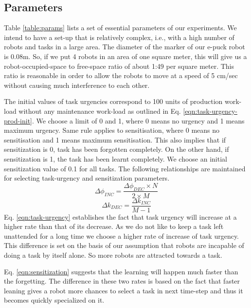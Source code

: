 \documentclass[smallcondensed]{svjour3}
\begin{document}
\subsection{Parameters}
Table \ref{table:params} lists a set of essential parameters of our experiments. We intend to have a set-up that is relatively complex, i.e., with a high number of robots and tasks in a large area. The diameter of the marker of our e-puck robot is 0.08m. So, if we put 4 robots in an area of one square meter, this will give us a robot-occupied-space to free-space ratio of about 1:49 per square meter. This ratio is reasonable in order to allow the robots to move at a speed of 5 cm/sec without causing much interference to each other. 

The initial values of task urgencies correspond to 100 units of production work-load without any maintenance work-load as outlined in Eq. \ref{eqn:task-urgency-prod-init}. We choose a limit of 0 and 1, where 0 means no urgency and 1 means maximum urgency. Same rule applies to sensitisation, where 0 means no sensitisation and 1 means maximum sensitisation. This also implies that if sensitization is 0, task has been forgotten completely. On the other hand, if sensitization is 1, the task has been learnt completely. We choose an initial sensitization value of 0.1 for all tasks. The following relationships are maintained for selecting task-urgency and sensitization parameters.
\begin{equation}
\Delta\phi_{INC} = \frac{\Delta\phi_{DEC} \times N}{2 \times M}
\label{eqn:task-urgency}
\end{equation}
%
\begin{equation}
\Delta k_{DEC} = \frac{\Delta k_{INC}} {M - 1} 
\label{eqn:sensitization}
\end{equation}
%
Eq. \ref{eqn:task-urgency} establishes the fact that task urgency will increase at a higher rate than that of its decrease. As we do not like to keep a task left unattended for a long time we choose a higher rate of increase of task urgency. This difference is set on the basis of our assumption that robots are incapable of doing a task by itself alone. So more robots are attracted towards a task.

Eq. \ref{eqn:sensitization} suggests that the learning will happen much faster than the forgetting. The difference in these two rates is based on the fact that faster leaning gives a robot more chances to select a task in next time-step and thus it becomes quickly specialized on it.
\end{document}
